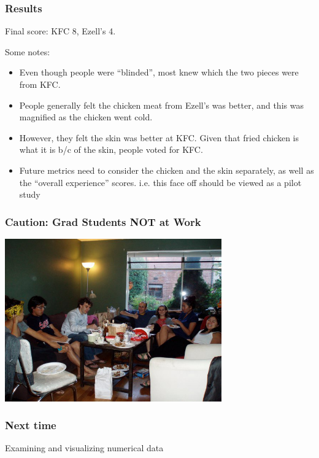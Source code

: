 \documentclass[handout]{beamer}
\newcommand{\blue}[1]{\textcolor{blue2}{#1}}
\begin{document}
\begin{frame}
\frametitle{Results}
Final score:  KFC 8, Ezell's 4.

Some notes:
\begin{itemize}
\pause\item Even though people were ``blinded'', most knew which the two pieces were from KFC.  
\pause\item People generally felt the chicken meat from Ezell's was better, and this was magnified as the chicken went cold.
\pause\item However, they felt the skin was better at KFC.  Given that fried chicken is what it is b/c of the skin, people voted for KFC.
\pause\item Future metrics need to consider the chicken and the skin separately, as well as the ``overall experience'' scores.  i.e. this face off should be viewed as a \blue{pilot study} 
\end{itemize}

\end{frame}


\begin{frame}
\frametitle{Caution: Grad Students NOT at Work}

\begin{center}
\includegraphics[height=7cm]{figure/fried_chicken}
\end{center}

\end{frame}


\begin{frame}
\frametitle{Next time}
Examining and visualizing numerical data
\end{frame}
\end{document}
